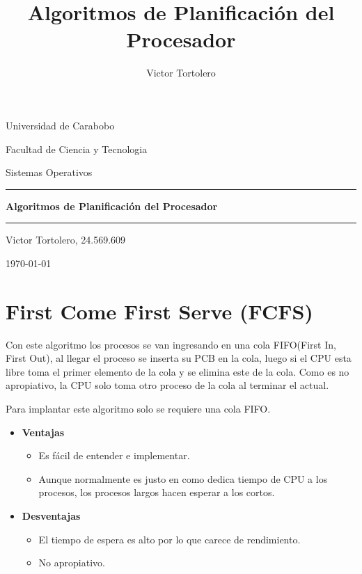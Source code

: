 \documentclass{article}
\begin{document}
\title{Algoritmos de Planificación del Procesador}
\author{Victor Tortolero}

\centerline{Universidad de Carabobo}
\centerline{Facultad de Ciencia y Tecnologia}
\centerline{Sistemas Operativos}

\vspace{8cm}
\begin{centering}
\hrule 	\vspace{0.4cm}
	{ \Huge \bfseries Algoritmos de Planificación del Procesador \\[0.4cm] }
\hrule \vfill
\end{centering}

\vfill
\centerline{Victor Tortolero, 24.569.609}


\centerline{\today}

\newpage


\flushleft
\setlength{\parindent}{20pt}


\justify

{\centering \section{First Come First Serve (FCFS)}}

Con este algoritmo los procesos se van ingresando en una cola FIFO(First In, First Out), 
al llegar el proceso se inserta su PCB en la cola, luego si el CPU esta libre toma el primer
elemento de la cola y se elimina este de la cola. Como es no apropiativo, la CPU solo toma
otro proceso de la cola al terminar el actual.

Para implantar este algoritmo solo se requiere una cola FIFO.

\begin{itemize}
	\item \textbf{Ventajas}
	\begin{itemize}
			\item Es fácil de entender e implementar.
			\item Aunque normalmente es justo en como dedica tiempo de CPU a los procesos,
			los procesos largos hacen esperar a los cortos.
	\end{itemize}

	\item \textbf{Desventajas}
	\begin{itemize}
		\item El tiempo de espera es alto por lo que carece de rendimiento.
		\item No apropiativo.
	\end{itemize}
\end{itemize}
\end{document}
